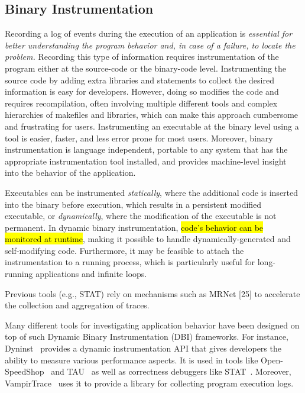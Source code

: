 \subsection{Binary Instrumentation}
Recording a log of events during the execution of an application is \textit{essential for better understanding the program behavior and, in case of a failure, to locate the problem.} Recording this type of information requires instrumentation of the program either at the source-code or the binary-code level. Instrumenting the source code by adding extra libraries and statements to collect the desired information is easy for developers. However, doing so modifies the code and requires recompilation, often involving multiple different tools and complex hierarchies of makefiles and libraries, which can make this approach cumbersome and frustrating for users. Instrumenting an executable at the binary level using a tool is easier, faster, and less error prone for most users. Moreover, binary instrumentation is language independent, portable to any system that has the appropriate instrumentation tool installed, and provides machine-level insight into the behavior of the application.

Executables can be instrumented \textit{statically}, where the additional code is inserted into the binary before execution, which results in a persistent modified executable, or \textit{dynamically}, where the modification of the executable is not permanent. In dynamic binary instrumentation, \hl{code's behavior can be monitored at runtime}, making it possible to handle dynamically-generated and self-modifying code. Furthermore, it may be feasible to attach the instrumentation to a running process, which is particularly useful for long-running applications and infinite loops.


Previous tools (e.g., STAT) rely on mechanisms such as MRNet [25]
to accelerate the collection and aggregation of traces.



Many different tools for investigating application behavior have been designed on top of such Dynamic Binary Instrumentation (DBI) frameworks. For instance, Dyninst~\cite{dyninst} provides a dynamic instrumentation API that gives developers the ability to measure various performance aspects. It is used in tools like Open-SpeedShop~\cite{openss} and TAU~\cite{tau} as well as correctness debuggers like STAT~\cite{stat}. Moreover, VampirTrace~\cite{vampirt} uses it to provide a library for collecting program execution logs. 

